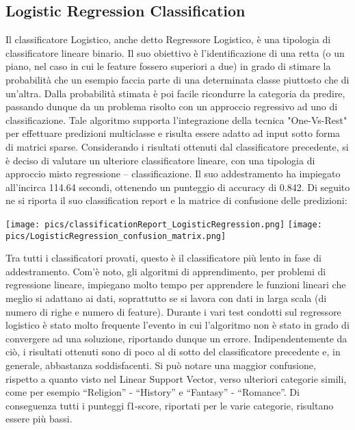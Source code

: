\documentclass[12pt,oneside]{article}
\begin{document}
    \begin{enumerate}
    
    \subsection{Logistic Regression Classification}
    \begin{justify}
    Il classificatore Logistico, anche detto Regressore Logistico, è una tipologia di classificatore lineare binario. Il suo obiettivo è l’identificazione di una retta (o un piano, nel caso in cui le feature fossero superiori a due) in grado di stimare la probabilità che un esempio faccia parte di una determinata classe piuttosto che di un’altra. Dalla probabilità stimata è poi facile ricondurre la categoria da predire, passando dunque da un problema risolto con un approccio regressivo ad uno di classificazione. Tale algoritmo supporta l’integrazione della tecnica "One-Vs-Rest" per effettuare predizioni multiclasse e risulta essere adatto ad input sotto forma di matrici sparse. Considerando i risultati ottenuti dal classificatore precedente, si è deciso di valutare un ulteriore classificatore lineare, con una tipologia di approccio misto regressione – classificazione.
    Il suo addestramento ha impiegato all’incirca 114.64 secondi, ottenendo un punteggio di accuracy di 0.842. 
    Di seguito ne si riporta il suo classification report e la matrice di confusione delle predizioni:
    \end{justify}

    \centering
    \texttt{[image: pics/classificationReport\_LogisticRegression.png]}
    \texttt{[image: pics/LogisticRegression\_confusion\_matrix.png]}

    \begin{justify}
    Tra tutti i classificatori provati, questo è il classificatore più lento in fase di addestramento. Com’è noto, gli algoritmi di apprendimento, per problemi di regressione lineare, impiegano molto tempo per apprendere le funzioni lineari che meglio si adattano ai dati, soprattutto se si lavora con dati in larga scala (di numero di righe e numero di feature). Durante i vari test condotti sul regressore logistico è stato molto frequente l'evento in cui l’algoritmo non è stato in grado di convergere ad una soluzione, riportando dunque un errore. Indipendentemente da ciò, i risultati ottenuti sono di poco al di sotto del classificatore precedente e, in generale, abbastanza soddisfacenti. Si può notare una maggior confusione, rispetto a quanto visto nel Linear Support Vector, verso ulteriori categorie simili, come per esempio “Religion” - “History” e “Fantasy” - “Romance”. Di conseguenza tutti i punteggi f1-score, riportati per le varie categorie, risultano essere più bassi. 
    \end{justify}
    \end{enumerate}
\end{document}
